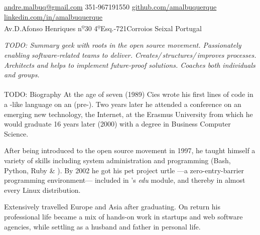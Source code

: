 \documentclass[10pt,a4paper]{article}
\newcommand{\ulo}{\textsuperscript{\b{o}}} %
\begin{document}
\sloppy  %



\nobreakvspace{0.3em}  %

\noindent\href{mailto:andre.malbuq.at.gmail.com}{andre.malbuq\mbox{}@\mbox{}gmail.com}\sbull
\textsmaller{+}351-967191550\sbull
\href{https://github.com/amalbuquerque}{github.com/amalbuquerque}\sbull
\href{http://linkedin.com/in/amalbuquerque}{linkedin.com/in/amalbuquerque}
\\
Av.\thinspace D.\thinspace Afonso Henriques n\ulo 30 4\ulo Esq.-721\thinspace Corroios\sbull
Seixal\sbull
Portugal

\spacedhrule{0.9em}{-0.4em}  %


\vspace{-1.3em}  %
\begin{multicols}{2}  %
\noindent \emph{TODO: Summary geek with roots in the open source movement. Passionately enabling software-related teams to deliver. Creates/\,structures/\,improves processes. Architects and helps to implement future-proof solutions. Coaches both individuals and groups.}
\\
\\
TODO: Biography At the age of seven (1989) Cies wrote his first lines of code in a -like language on an  (pre-).  Two years later he attended a conference on an emerging new technology, the Internet, at the Erasmus University from which he would graduate 16 years later (2000) with a degree in Business Computer Science.

After being introduced to the open source movement in 1997, he taught himself a variety of skills including system administration and programming (Bash, Python, Ruby \& \CPP).  By 2002 he got his pet project urtle ---a zero-entry-barrier programming environment--- included in 's \emph{edu} module, and thereby in almost every Linux distribution.

Extensively travelled Europe and Asia after graduating. On return his professional life became a mix of hands-on work in startups and web software agencies, while settling as a husband and father in personal life.
\end{multicols}
\end{document}
